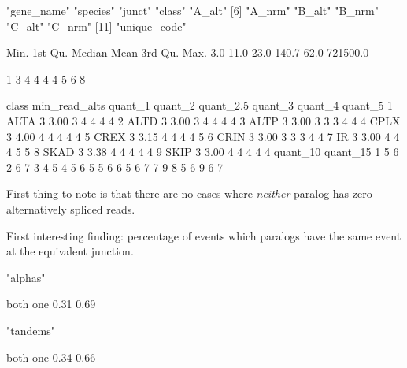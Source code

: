 \documentclass{article}
\begin{document}
\begin{Schunk}
\begin{Soutput}
 [1] "gene_name"   "species"     "junct"       "class"       "A_alt"      
 [6] "A_nrm"       "B_alt"       "B_nrm"       "C_alt"       "C_nrm"      
[11] "unique_code"
\end{Soutput}
\begin{Soutput}
    Min.  1st Qu.   Median     Mean  3rd Qu.     Max. 
     3.0     11.0     23.0    140.7     62.0 721500.0 
\end{Soutput}
\begin{Soutput}
  1%   2% 2.5%   3%   4%   5%  10%  15% 
   3    4    4    4    4    5    6    8 
\end{Soutput}
\begin{Soutput}
  class min_read_alts quant_1 quant_2 quant_2.5 quant_3 quant_4 quant_5
1  ALTA             3    3.00       3         4       4       4       4
2  ALTD             3    3.00       3         4       4       4       4
3  ALTP             3    3.00       3         3       3       4       4
4  CPLX             3    4.00       4         4       4       4       4
5  CREX             3    3.15       4         4       4       4       5
6  CRIN             3    3.00       3         3       3       4       4
7    IR             3    3.00       4         4       4       5       5
8  SKAD             3    3.38       4         4       4       4       4
9  SKIP             3    3.00       4         4       4       4       4
  quant_10 quant_15
1        5        6
2        6        7
3        4        5
4        5        6
5        5        6
6        5        6
7        7        9
8        5        6
9        6        7
\end{Soutput}
\end{Schunk}

First thing to note is that there are no cases where \textit{neither} paralog has zero alternatively spliced reads.





First interesting finding: percentage of events which paralogs have the same event at the equivalent junction.\

\begin{Schunk}
\begin{Soutput}
[1] "alphas"
\end{Soutput}
\begin{Soutput}
both  one 
0.31 0.69 
\end{Soutput}
\begin{Soutput}
[1] "tandems"
\end{Soutput}
\begin{Soutput}
both  one 
0.34 0.66 
\end{Soutput}
\end{Schunk}
\end{document}
